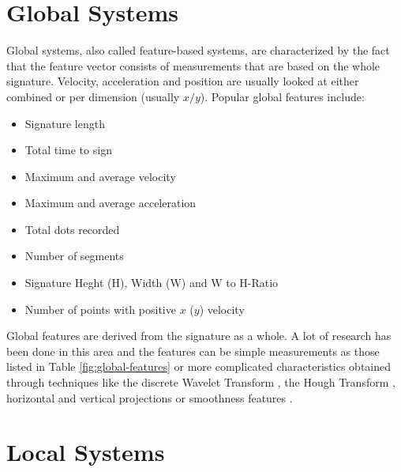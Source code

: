 \documentclass[a4paper, oneside]{csthesis}
\begin{document}
\section{Global Systems}
\label{sec:features}

Global systems, also called feature-based systems, are characterized by the fact that the feature vector consists of measurements that are based on the whole signature. Velocity, acceleration and position are usually looked at either combined or per dimension (usually $x/y$). Popular global features include:

\begin{itemize}
\item Signature length
\item Total time to sign
\item Maximum and average velocity
\item Maximum and average acceleration
\item Total dots recorded
\item Number of segments
\item Signature Heght (H), Width (W) and W to H-Ratio
\item Number of points with positive $x$ ($y$) velocity
\end{itemize}


Global features are derived from the signature as a whole. A lot of research has been done in this area and the features can be simple measurements as those listed in Table \ref{fig:global-features} or more complicated characteristics obtained through techniques like the discrete Wavelet Transform \cite{ji2005signature}, the Hough Transform \cite{kaewkongka1999off}, horizontal and vertical projections \cite{fang2003off} or smoothness features \cite{fang2001offline}.







\section{Local Systems}
\label{sec:functions}
\end{document}
